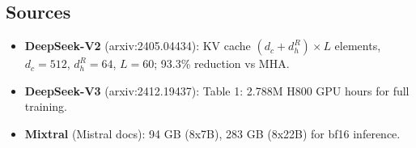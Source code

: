 \documentclass[11pt]{article}
\begin{document}
\subsection{Sources}

\begin{itemize}
  \item \textbf{DeepSeek-V2} (arxiv:2405.04434): KV cache $(d_c + d^R_h) \times L$ elements,
  $d_c = 512$, $d^R_h = 64$, $L = 60$; 93.3\% reduction vs MHA.
  \item \textbf{DeepSeek-V3} (arxiv:2412.19437): Table 1: 2.788M H800 GPU hours for full training.
  \item \textbf{Mixtral} (Mistral docs): 94 GB (8x7B), 283 GB (8x22B) for bf16 inference.
\end{itemize}
\end{document}
